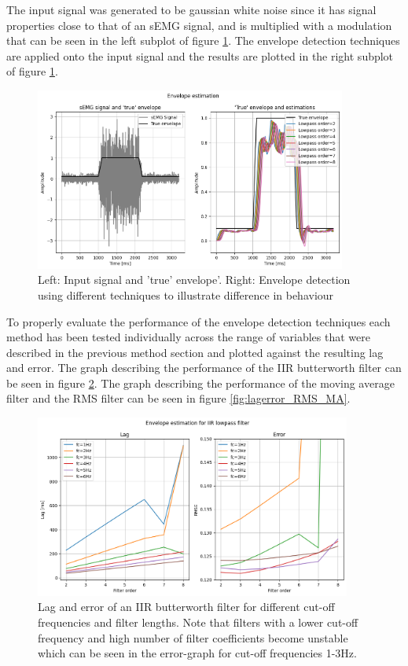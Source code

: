 The input signal was generated to be gaussian white noise since it has signal properties close to that of an sEMG signal, and is multiplied with a modulation that can be seen in the left subplot of figure \ref{fig:envelope_detection}. The envelope detection techniques are applied onto the input signal and the results are plotted in the right subplot of figure \ref{fig:envelope_detection}.

\begin{figure}[h!t]
	\begin{center}
		\includegraphics[height=60mm]{images/envelope_detection.png}
	\end{center}
	\caption{Left: Input signal and 'true' envelope'. Right: Envelope detection using different techniques to illustrate difference in behaviour}
	\label{fig:envelope_detection}
\end{figure}

To properly evaluate the performance of the envelope detection techniques each method has been tested individually across the range of variables that were described in the previous method section and plotted against the resulting lag and error. The graph describing the performance of the IIR butterworth filter can be seen in figure \ref{fig:lagerror_iir}. The graph describing the performance of the moving average filter and the RMS filter can be seen in figure \ref{fig:lagerror_RMS_MA}.

\begin{figure}[h!t]
	\begin{center}
		\includegraphics[height=60mm]{images/lagerror_iirfilter.png}
	\end{center}
	\caption{Lag and error of an IIR butterworth filter for different cut-off frequencies and filter lengths. Note that filters with a lower cut-off frequency and high number of filter coefficients become unstable which can be seen in the error-graph for cut-off frequencies 1-3Hz.}
	\label{fig:lagerror_iir}
\end{figure}


